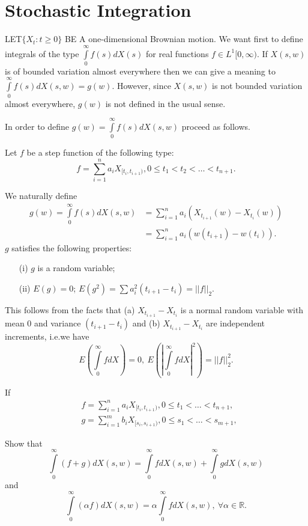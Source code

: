 \chapter{Stochastic Integration}\label{chap11}

LET\pageoriginale $\{X_{t}:t\geq 0\}$ BE A one-dimensional Brownian
motion. We want first to define integrals of the type
$\int\limits^{\infty}_{0}f(s)dX(s)$ for real functions $f\in
L^{1}[0,\infty)$. If $X(s,w)$ is of bounded variation almost
  everywhere then we can give a meaning to
  $\int\limits^{\infty}_{0}f(s)dX(s,w)=g(w)$. However, since $X(s,w)$
  is not bounded variation almost everywhere, $g(w)$ is not defined in
  the usual sense.

In order to define $g(w)=\int\limits^{\infty}_{0}f(s)dX(s,w)$ proceed
as follows.

Let $f$ be a step function of the following type:
$$
f=\sum\limits^{n}_{i=1}a_{i}X_{[t_{i},t_{i+1})}, 0\leq
  t_{1}<t_{2}<\ldots<t_{n+1}. 
$$

We naturally define
\begin{align*}
g(w)=\int\limits^{\infty}_{0}f(s)dX(s,w) &=
\sum\limits^{n}_{i=1}a_{i}(X_{t_{i+1}}(w)-X_{t_{i}}(w))\\
&= \sum\limits^{n}_{i=1}a_{i}(w(t_{i+1})-w(t_{i})).
\end{align*}
$g$ satisfies the following properties:
\begin{itemize}
\item[(i)] $g$ is a random variable;

\item[(ii)] $E(g)=0$; $E(g^{2})=\sum a^{2}_{i}(t_{i+1}-t_{i})=||f||_{2}$.
\end{itemize}

This follows from the facts that (a) $X_{t_{i+1}}-X_{t_{i}}$ is a
normal random variable with mean $0$ and variance $(t_{i+1}-t_{i})$
and (b) $X_{t_{i+1}}-X_{t_{i}}$ are independent increments, i.e.\@ we
have
$$
E\left(\int\limits^{\infty}_{0}fdX\right)=0,\ E\left(|\int\limits^{\infty}_{0}fdX |^{2}\right)=||f||^{2}_{2}.
$$\pageoriginale

\setcounter{exercise}{0}
\begin{exercise}\label{chap11-exer1}
If
\begin{align*}
& f=\sum\limits^{n}_{i=1}a_{i}X_{[t_{i},t_{i+1})}, 0\leq
    t_{1}<\ldots<t_{n+1},\\
& g=\sum\limits^{m}_{i=1}b_{i}X_{[s_{i},s_{i+1})}, 0\leq s_{1}<\ldots<s_{m+1},
\end{align*}

Show that
$$
\int\limits^{\infty}_{0}(f+g)dX(s,w)=\int\limits^{\infty}_{0}fdX(s,w)+\int\limits^{\infty}_{0}gdX(s,w)
$$
and 
$$
\int\limits^{\infty}_{0}(\alpha
f)dX(s,w)=\alpha\int\limits^{\infty}_{0}fdX(s,w),\ \forall \alpha\in
\mathbb{R}. 
$$
\end{exercise}

